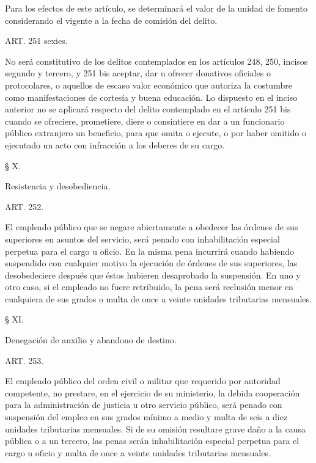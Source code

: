     Para los efectos de este artículo, se determinará el valor de la unidad de fomento considerando el vigente a la fecha de comisión del delito.

   
    ART. 251 sexies.

    No será constitutivo de los delitos contemplados en los artículos 248, 250, incisos segundo y tercero, y 251 bis aceptar, dar u ofrecer donativos oficiales o protocolares, o aquellos de escaso valor económico que autoriza la costumbre como manifestaciones de cortesía y buena educación.
    Lo dispuesto en el inciso anterior no se aplicará respecto del delito contemplado en el artículo 251 bis cuando se ofreciere, prometiere, diere o consintiere en dar a un funcionario público extranjero un beneficio, para que omita o ejecute, o por haber omitido o ejecutado un acto con infracción a los deberes de su cargo.


    § X.

    Resistencia y desobediencia.





    ART. 252.

    El empleado público que se negare abiertamente a obedecer las órdenes de sus superiores en asuntos del servicio, será penado con inhabilitación especial perpetua para el cargo u oficio.
    En la misma pena incurrirá cuando habiendo suspendido con cualquier motivo la ejecución de órdenes de sus superiores, las desobedeciere después que éstos hubieren desaprobado la suspensión.
    En uno y otro caso, si el empleado no fuere retribuido, la pena será reclusión menor en cualquiera de sus grados o multa de once a veinte unidades tributarias mensuales.







    § XI.

    Denegación de auxilio y abandono de destino.





    ART. 253.

    El empleado público del orden civil o militar que requerido por autoridad competente, no prestare, en el ejercicio de su ministerio, la debida cooperación para la administración de justicia u otro servicio público, será penado con suspensión del empleo en sus grados mínimo a medio y multa de seis a diez unidades tributarias mensuales.
    Si de su omisión resultare grave daño a la causa pública o a un tercero, las penas serán inhabilitación especial perpetua para el cargo u oficio y multa de once a veinte unidades tributarias mensuales.






